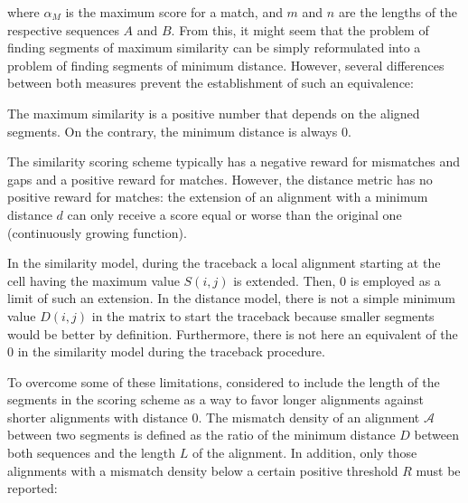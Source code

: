 where $\alpha_M$ is the maximum score for a match, and $m$ and $n$ are the lengths of the respective 
sequences $A$ and $B$. From this, it might seem that the problem of finding segments of maximum 
similarity can be simply reformulated into a problem of finding segments of minimum distance. However, 
several differences between both measures prevent the establishment of such an equivalence:

\begin{mitemize}
\item
The maximum similarity is a positive number that depends on the aligned segments.
On the contrary, the minimum distance is always $0$.
\item
The similarity scoring scheme typically has a negative reward for mismatches and gaps and a positive
reward for matches. However, the distance metric has no positive reward for matches: the extension of an 
alignment with a minimum distance $d$ can only receive a score equal or worse than the original one
(continuously growing function).
\item
In the similarity model, during the traceback a local alignment starting at the cell having the maximum
value $S(i,j)$ is extended.  Then, $0$ is employed as a limit of such an extension. In the distance 
model, there is not a simple minimum value $D(i,j)$ in the matrix to start the traceback because smaller
segments would be better by definition. Furthermore, there is not here an equivalent of the $0$ in the 
similarity model during the traceback procedure.
\end{mitemize}

To overcome some of these limitations, \citet{goad:1982a} considered to include the length of the segments
in the scoring scheme as a way to favor longer alignments against shorter alignments with distance $0$. 
The mismatch density 
of an alignment $\mathcal{A}$ between two segments is defined as the ratio of the 
minimum distance $D$ between both sequences and the length $L$ of the alignment. In addition, only those 
alignments with a mismatch density below a certain positive threshold $R$ must be reported:

\begin{center}
\end{center}

